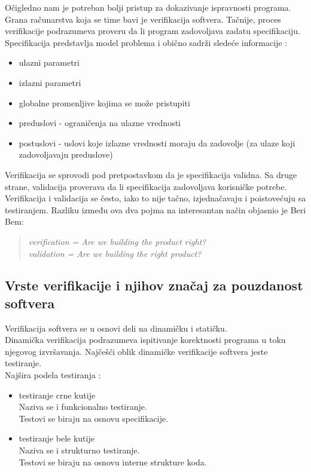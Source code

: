\documentclass[a4paper]{article}
\begin{document}
Očigledno nam je potreban bolji pristup za dokazivanje ispravnosti programa.
Grana računarstva koja se time bavi je verifikacija softvera.
Tačnije, proces verifikacije podrazumeva proveru da li program zadovoljava zadatu specifikaciju. Specifikacija predstavlja model problema i obično sadrži sledeće informacije \cite{laski2009software}:
\begin{itemize}
\item ulazni parametri
\item izlazni parametri
\item globalne promenljive kojima se može pristupiti
\item preduslovi - ograničenja na ulazne vrednosti
\item postuslovi - uslovi koje izlazne vrednosti moraju da zadovolje (za ulaze koji zadovoljavaju preduslove)
\end{itemize}
Verifikacija se sprovodi pod pretpostavkom da je specifikacija validna.
Sa druge strane, validacija proverava da li specifikacija zadovoljava korisničke potrebe.
Verifikacija i validacija se često, iako to nije tačno, izjednačavaju i poistovećuju sa testiranjem.
Razliku između ova dva pojma na interesantan način objasnio je Beri Bem:
\begin{quote}
\emph{verification = Are we building the product right? \\
validation = Are we building the right product?}
\end{quote}


\subsection{Vrste verifikacije i njihov značaj za pouzdanost softvera}
\label{subsec:verifikacija}
Verifikacija softvera se u osnovi deli na dinamičku i statičku.\\
Dinamička verifikacija podrazumeva ispitivanje korektnosti programa u toku njegovog izvršavanja.
Najčešći oblik dinamičke verifikacije softvera jeste testiranje.\\
Najšira podela testiranja \cite{laski2009software}:
\begin{itemize}
\item testiranje crne kutije\\
Naziva se i funkcionalno testiranje.\\
Testovi se biraju na osnovu specifikacije.
\item testiranje bele kutije\\
Naziva se i strukturno testiranje.\\
Testovi se biraju na osnovu interne strukture koda.
\end{itemize}
\end{document}
